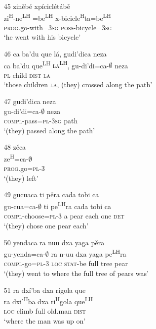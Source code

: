 \begin{itemize}
\item[45]
\glll zin\v{e}b\'{e} xp\'{i}cicl\'{e}t\'{a}b\v{e}\\
zi\textsuperscript{H}-ne\textsuperscript{LH} =be\textsuperscript{LH}  x-bicicle\textsuperscript{H}ta=be\textsuperscript{LH}\\
 \textsc{prog}.go-with=\textsc{3sg} \textsc{poss}-bicycle=\textsc{3sg}\\
\glt `he went with his bicycle'


\item[46]
\glll ca ba'du que l\'{a},  gudi'dica neza\\
ca ba'du que\textsuperscript{LH}  \textsc{la\textsuperscript{LH}}, gu-di'di=ca-$\emptyset$ neza\\
\textsc{pl} child \textsc{dist} \textsc{la}\\
\glt `those children \textsc{la}, (they) crossed along the path'


\item[47]
\glll gudi'dica neza\\
gu-di'di=ca-$\emptyset$ neza\\
\textsc{compl}-pass=\textsc{pl}-\textsc{3sg} path\\
\glt `(they) passed along the path' 


\item[48]
\glll z\v{e}ca\\
 ze\textsuperscript{H}=ca-$\emptyset$\\
\textsc{prog}.go=\textsc{pl}-\textsc{3}\\
\glt `(they) left'


\item[49]
\glll gucuaca ti p\v{e}ra cada tobi ca\\
gu-cua=ca-$\emptyset$ ti pe\textsuperscript{LH}ra cada tobi ca\\
\textsc{compl}-choose=\textsc{pl}-\textsc{3} a pear each one \textsc{det}\\
\glt `(they) chose one pear each'


\item[50]
\glll yendaca ra nuu dxa yaga p\v{e}ra\\
gu-yenda=ca-$\emptyset$ ra n-uu dxa yaga pe\textsuperscript{LH}ra\\
\textsc{compl}-go=\textsc{pl}-\textsc{3} \textsc{loc} \textsc{stat}-be full tree pear\\
\glt `(they) went to where the full tree of pears was'


\item[51]
\glll ra dx\'{i}'ba dxa r\'{i}gola que\\
ra dxi'\textsuperscript{H}ba dxa ri\textsuperscript{H}gola que\textsuperscript{LH}\\
\textsc{loc} climb full old.man \textsc{dist}\\
\glt `where the man was up on'



\end{itemize}

